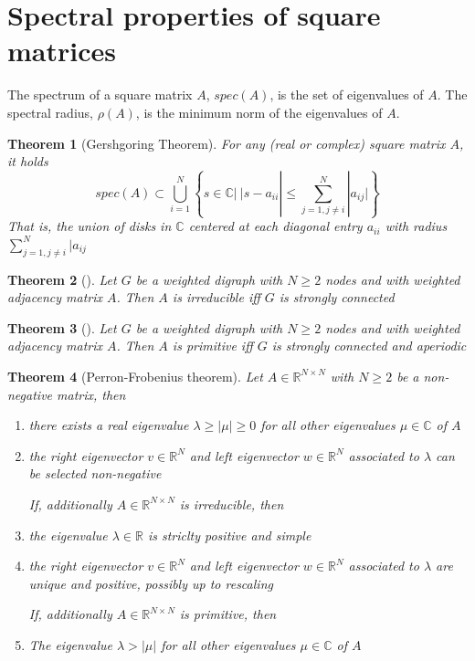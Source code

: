\documentclass{book}
\newcommand{\R}{\mathbb{R}}
\theoremstyle{theoremv2}
\newtheorem{theorem}{Theorem}[chapter]
\theoremstyle{defv2}
\theoremstyle{remark}
\theoremstyle{remark}
\theoremstyle{definition}
\theoremstyle{definition}
\begin{document}
\section{Spectral properties of square matrices}
The spectrum of a square matrix $A$, $spec(A)$, is the set of eigenvalues of $A$. The spectral radius, $\rho(A)$, is the minimum norm of the eigenvalues of $A$.
\begin{theorem}[Gershgoring Theorem]\label{gersh}
    For any (real or complex) square matrix $A$, it holds 
    \[
        spec(A)\subset \bigcup_{i=1}^N \left\{ s\in\mathbb{C} |\ |s-a_{ii}| \leq \displaystyle\sum_{j=1, j\neq i}^{N}|a_{ij}| \right\}
    \]
    That is, the union of disks in $\mathbb{C}$ centered at each diagonal entry $a_{ii}$ with radius $\sum_{j=1,j\neq i}^{N}|a_{ij}$
\end{theorem}
\begin{theorem}[]
    Let $G$ be a weighted digraph with $N\geq2$ nodes and with weighted adjacency matrix $A$. Then $A$ is irreducible iff $G$ is strongly connected
\end{theorem}
\begin{theorem}[]
    Let $G$ be a weighted digraph with $N\geq2$ nodes and with weighted adjacency matrix $A$. Then $A$ is primitive iff $G$ is strongly connected and aperiodic
\end{theorem}
\begin{theorem}[Perron-Frobenius theorem]
    Let $A\in\R^{N\times N}$ with $N\geq2$ be a non-negative matrix, then 
    \begin{enumerate}
        \item there exists a real eigenvalue $\lambda\geq |\mu|\geq0$ for all other eigenvalues $\mu\in\mathbb{C}$ of $A$
        \item the right eigenvector $v\in\R^N$ and left eigenvector $w\in\R^N$ associated to $\lambda$ can be selected non-negative 

            If, additionally $A\in\R^{N\times N}$ is irreducible, then 
        \item the eigenvalue $\lambda\in\R$ is striclty positive and simple
        \item the right eigenvector $v\in\R^N$ and left eigenvector $w\in\R^N$ associated to $\lambda$ are unique and positive, possibly up to rescaling

            If, additionally $A\in\R^{N\times N}$ is primitive, then
        \item The eigenvalue $\lambda>|\mu|$ for all other eigenvalues $\mu\in\mathbb{C}$ of $A$
    \end{enumerate}
\end{theorem}
\end{document}
